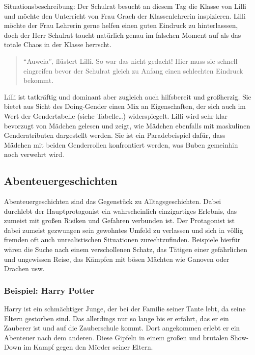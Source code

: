 Situationsbeschreibung: Der Schulrat besucht an diesem Tag die Klasse
von Lilli und möchte den Unterricht von Frau Grach der Klassenlehrerin
inspizieren. Lilli möchte der Frau Lehrerin gerne helfen einen guten
Eindruck zu hinterlasssen, doch der Herr Schulrat taucht natürlich genau
im falschen Moment auf als das totale Chaos in der Klasse herrscht.

\begin{quote}
``Auweia'', flüstert Lilli. So war das nicht gedacht! Hier muss sie
schnell eingreifen bevor der Schulrat gleich zu Anfang einen schlechten
Eindruck bekommt. \parencite[][47
]{KNISTER1999}
\end{quote}

Lilli ist tatkräftig und dominant aber zugleich auch hilfsbereit und
großherzig. Sie bietet aus Sicht des Doing-Gender einen Mix an
Eigenschaften, der sich auch im Wert der Gendertabelle (siehe
Tabelle\ldots{}) widerspiegelt. Lilli wird sehr klar bevorzugt von
Mädchen gelesen und zeigt, wie Mädchen ebenfalls mit maskulinen
Genderatributen dargestellt werden. Sie ist ein Paradebeispiel dafür,
dass Mädchen mit beiden Genderrollen konfrontiert werden, was Buben
gemeinhin noch verwehrt wird.

\subsection{Abenteuergeschichten}

Abenteuergeschichten sind das Gegenstück zu Alltagsgeschichten. Dabei
durchlebt der Hauptprotagonist ein wahrscheinlich einzigartiges
Erlebnis, das zumeist mit großen Risiken und Gefahren verbunden ist. Der
Protagonist ist dabei zumeist gezwungen sein gewohntes Umfeld zu
verlassen und sich in völlig fremden oft auch unrealistischen
Situationen zurechtzufinden. Beispiele hierfür wären die Suche nach
einem verschollenen Schatz, das Tätigen einer gefährlichen und
ungewissen Reise, das Kämpfen mit bösen Mächten wie Ganoven oder Drachen
usw.

\subsubsection{Beispiel: Harry Potter}

Harry ist ein schmächtiger Junge, der bei der Familie seiner Tante lebt,
da seine Eltern gestorben sind. Das allerdings nur so lange bis er
erfährt, das er ein Zauberer ist und auf die Zauberschule kommt. Dort
angekommen erlebt er ein Abenteuer nach dem anderen. Diese Gipfeln in
einem großen und brutalen Show-Down im Kampf gegen den Mörder seiner
Eltern. \parencite{Rowling1998}

